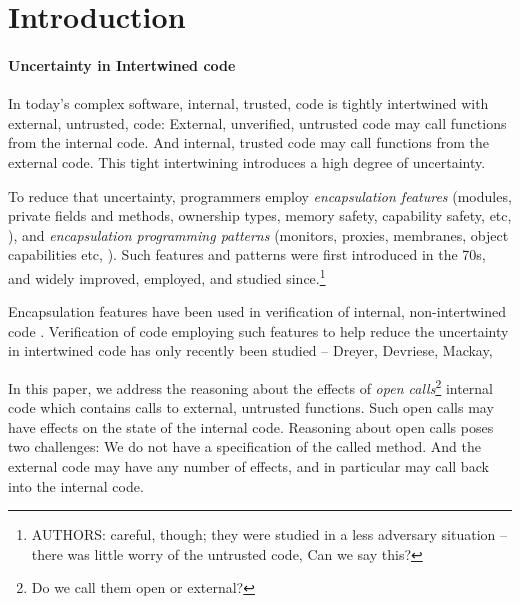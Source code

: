 \section{Introduction}
\label{s:intro}

\newcommand{\Tamed}{Tamed\xspace}
\newcommand{\tamed}{tamed\xspace}
\newcommand{\tame}{tame\xspace}
\newcommand{\tames}{tames\xspace}
\newcommand{\Taming}{Taming\xspace}
\newcommand{\taming}{taming\xspace}

\paragraph{Uncertainty in Intertwined code} In today's complex software, internal, trusted, code  is tightly intertwined  with external, untrusted, code:
External, unverified, untrusted code may call functions from the internal code.
And internal, trusted code may call functions from the  external  code.
This tight intertwining   introduces a high degree of uncertainty.

To  reduce  that uncertainty, programmers employ  
\emph{encapsulation  features}
 (\eg   modules, private fields and methods, ownership types, memory safety, capability safety,  etc, \cite{private}),
and \emph{encapsulation  programming patterns} (\eg monitors, proxies, membranes, object capabilities etc, \cite{mebranes}).
Such  features and patterns were first introduced in the 70s, and widely improved, employed, and studied since.\footnote{AUTHORS: careful, though; they were studied in a less adversary situation -- there was little worry of the untrusted code, Can we say this?}

Encapsulation features have been  used in   verification of internal, non-intertwined code  \cite{Muller, Leino}.
Verification of code employing such  features to help reduce the uncertainty in intertwined code
has only recently  been studied \cite{xxx} -- Dreyer, Devriese, Mackay,  

%
In this paper, we address the reasoning about the effects of  \emph{open calls}\footnote{Do we call them open or external?} 
\ie  internal code which contains calls to external, untrusted functions.
Such open calls may have effects on the state of the internal code. 
Reasoning about  open calls poses two challenges:  
We do not have a specification of the called method. 
And the external code may have any number of effects, and in particular may call back into the internal code.

